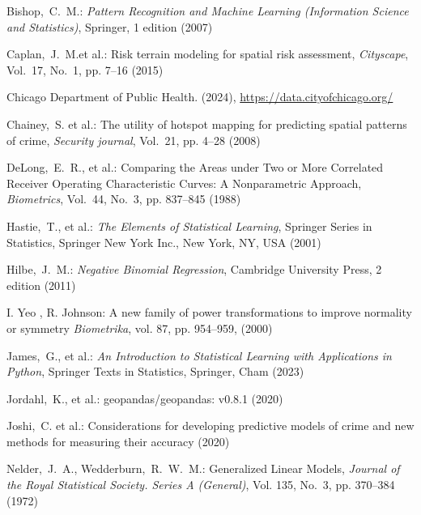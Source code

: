 \begin{thebibliography}{}

  Bishop,~C.~M.: {\em Pattern Recognition and Machine Learning (Information Science and Statistics)}, Springer, 1 edition (2007)
  
  Caplan,~J.~M.et al.: Risk terrain modeling for spatial risk assessment, {\em Cityscape}, Vol.~17, No.~1, pp. 7--16 (2015)
  
  Chicago Department of Public Health. (2024), \url{https://data.cityofchicago.org/}
  
  Chainey,~S. et al.: The utility of hotspot mapping for predicting spatial patterns of crime, {\em Security journal}, Vol.~21, pp. 4--28 (2008)
  
  DeLong,~E.~R., et al.: Comparing the Areas under Two or More Correlated Receiver Operating Characteristic Curves: A Nonparametric Approach, {\em Biometrics}, Vol.~44, No.~3, pp. 837--845 (1988)
  
  Hastie,~T., et al.: {\em The Elements of Statistical Learning}, Springer Series in Statistics, Springer New York Inc., New York, NY, USA (2001)
  
  Hilbe,~J.~M.: {\em Negative Binomial Regression}, Cambridge University Press, 2 edition (2011)

  I. Yeo , R. Johnson: A new family of power transformations to improve normality or symmetry {\em Biometrika}, vol. 87, pp. 954--959, (2000)

  James,~G., et al.: {\em An Introduction to Statistical Learning with Applications in Python}, Springer Texts in Statistics, Springer, Cham (2023)
  
  Jordahl,~K., et al.: geopandas/geopandas: v0.8.1 (2020)
  
  Joshi,~C. et al.: Considerations for developing predictive models of crime and new methods for measuring their accuracy (2020)
  
  Nelder,~J.~A., Wedderburn,~R.~W.~M.: Generalized Linear Models, {\em Journal of the Royal Statistical Society. Series A (General)}, Vol. 135, No.~3, pp. 370--384 (1972)
  

\end{thebibliography}
